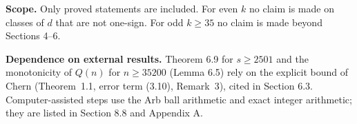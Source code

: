 \textbf{Scope.} Only proved statements are included. For even \(k\) no claim is made on classes of \(d\) that are not one-sign. For odd \(k\ge35\) no claim is made beyond Sections 4--6.

\textbf{Dependence on external results.} Theorem 6.9 for \(s\ge2501\) and the monotonicity of \(Q(n)\) for \(n\ge35200\) (Lemma 6.5) rely on the explicit bound of Chern \cite{Chern} (Theorem~1.1, error term (3.10), Remark~3), cited in Section 6.3. Computer-assisted steps use the Arb ball arithmetic \cite{Arb} and exact integer arithmetic; they are listed in Section 8.8 and Appendix A.
